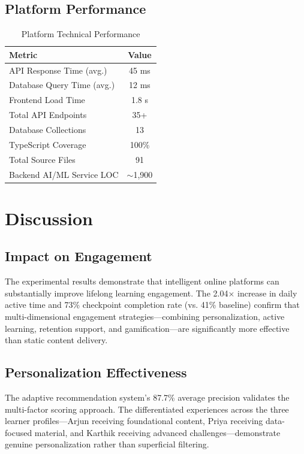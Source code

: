 \documentclass[conference]{IEEEtran}
\begin{document}
\subsection{Platform Performance}

\begin{table}[htbp]
\caption{Platform Technical Performance}
\label{tab:platform_perf}
\centering
\begin{tabular}{lc}
\toprule
\textbf{Metric} & \textbf{Value} \\
\midrule
API Response Time (avg.) & 45 ms \\
Database Query Time (avg.) & 12 ms \\
Frontend Load Time & 1.8 s \\
Total API Endpoints & 35+ \\
Database Collections & 13 \\
TypeScript Coverage & 100\% \\
Total Source Files & 91 \\
Backend AI/ML Service LOC & $\sim$1,900 \\
\bottomrule
\end{tabular}
\end{table}

\section{Discussion}

\subsection{Impact on Engagement}

The experimental results demonstrate that intelligent online platforms can substantially improve lifelong learning engagement. The 2.04$\times$ increase in daily active time and 73\% checkpoint completion rate (vs. 41\% baseline) confirm that multi-dimensional engagement strategies---combining personalization, active learning, retention support, and gamification---are significantly more effective than static content delivery.

\subsection{Personalization Effectiveness}

The adaptive recommendation system's 87.7\% average precision validates the multi-factor scoring approach. The differentiated experiences across the three learner profiles---Arjun receiving foundational content, Priya receiving data-focused material, and Karthik receiving advanced challenges---demonstrate genuine personalization rather than superficial filtering.
\end{document}
